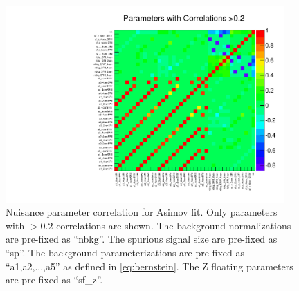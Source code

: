 \begin{figure}[htbp]
  \centering
 \includegraphics[width=0.95\textwidth]{figures/VBF/Correlation.pdf}

\caption{Nuisance parameter correlation for Asimov fit. Only parameters with $>0.2$ correlations are shown. The background normalizations are pre-fixed as ``nbkg''. The spurious signal size are pre-fixed as ``sp''. The background parameterizations are pre-fixed as ``a1,a2,...,a5'' as defined in \ref{eq:bernstein}. The Z floating parameters are pre-fixed as ``sf\_z''. }
  \label{fig:corr_asimov}
\end{figure}


